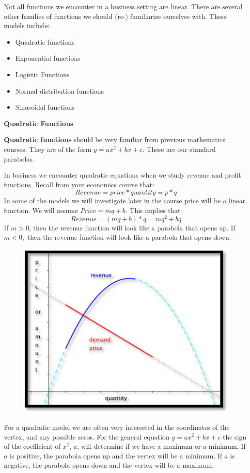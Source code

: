 \documentclass[10pt,]{book}
\newcommand{\terminology}[1]{\textbf{#1}}
\theoremstyle{plain}
\theoremstyle{definition}
\theoremstyle{definition}
\newcommand{\lt}{ < }
\begin{document}
	Not all functions we encounter in a business setting are linear. There are several other families of functions we should (re-) familiarize ourselves with. These models include:\leavevmode%
\begin{itemize}[label=\textbullet]
\item{}	Quadratic functions%
\item{}	Exponential functions%
\item{}	Logistic Functions%
\item{}	Normal distribution functions%
\item{}	Sinusoidal functions%
\end{itemize}
%
\par
\terminology{Quadratic Functions}%
\par
\terminology{Quadratic functions} should be very familiar from previous mathematics courses. They are of the form \(y=a x^2+b x+c\). These are our standard parabolas.%
\par
In business we encounter quadratic equations when we study revenue and profit functions. Recall from your economics course that:
\begin{equation*}Revenue=price*quantity=p*q\end{equation*}
In some of the models we will investigate later in the course price will be a linear function. We will assume \(Price=m q+b\). This implies that 
\begin{equation*}Revenue=(m q+b)*q=m q^2+b q\end{equation*}
If \(m > 0\), then the revenue function will look like a parabola that opens up. If \(m \lt 0,\) then the revenue function will look like a parabola that opens down.
%
\leavevmode%
\begin{figure}
\centering
\includegraphics[width=0.5\linewidth]{images/sec1-2-QuadraticFunctions.png}
\end{figure}
\par
For a quadratic model we are often very interested in the coordinates of the vertex, and any possible zeros. For the general equation \(y=a x^2+b x+c\) the sign of the coefficient of \(x^2\), \(a\), will determine if we have a maximum or a minimum. If \(a\) is positive, the parabola opens up and the vertex will be a minimum. If \(a\) is negative, the parabola opens down and the vertex will be a maximum.%
\par
\end{document}
